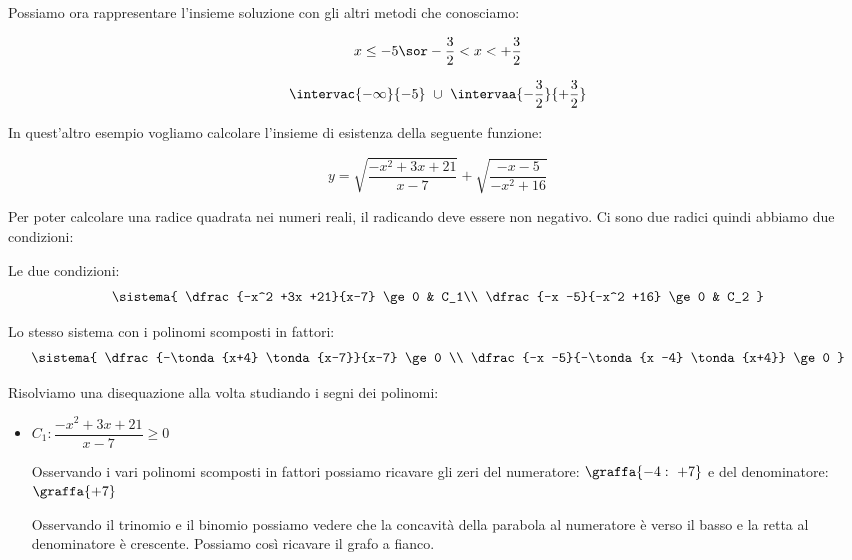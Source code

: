 \begin{esempio}
Possiamo ora rappresentare l'insieme soluzione con gli altri metodi che
conosciamo:

\begin{minipage}{.49 \linewidth}
\[x \le -5 \sor -\dfrac{3}{2} < x < +\dfrac{3}{2}\]
\end{minipage}
\hfill
\begin{minipage}{.49 \linewidth}
\[\intervac{-\infty}{-5}~\cup~\intervaa{-\dfrac{3}{2}}{+\dfrac{3}{2}}\]
\end{minipage}
\end{esempio}

\newpage %

\begin{esempio}

In quest'altro esempio vogliamo calcolare l'insieme di esistenza della
seguente funzione:

\[y = \sqrt{\dfrac{-x^2 +3x +21}{x-7}} + \sqrt{\dfrac{-x -5}{-x^2 +16}}
\]

Per poter calcolare una radice quadrata nei numeri reali, il radicando deve
essere non negativo. Ci sono due radici quindi abbiamo due condizioni:

\begin{minipage}{.49 \linewidth}
Le due condizioni:
 \[\sistema{
    \dfrac{-x^2 +3x +21}{x-7} \ge 0 & C_1\\
    \dfrac{-x -5}{-x^2 +16} \ge 0 & C_2
  }
\]
\end{minipage}
\begin{minipage}{.49 \linewidth}
Lo stesso sistema con i polinomi scomposti in fattori:
\[\sistema{
    \dfrac{-\tonda{x+4} \tonda{x-7}}{x-7} \ge 0 \\
    \dfrac{-x -5}{-\tonda{x -4} \tonda{x+4}} \ge 0
  }
\]
\end{minipage}

Risolviamo una disequazione alla volta studiando i segni dei polinomi:

\begin{itemize}
 \item \(C_1: \dfrac{-x^2 +3x +21}{x-7} \ge 0\)

Osservando i vari polinomi scomposti in fattori possiamo ricavare gli zeri
del numeratore: \(\graffa{-4:~+7}\) e del denominatore: \(\graffa{+7}\)

\begin{minipage}{.49\textwidth}
Osservando il trinomio e il binomio possiamo vedere che la concavità della
parabola al numeratore è verso il basso e la retta al
denominatore è crescente. Possiamo così ricavare il grafo a fianco.
\end{minipage}
\hfill
\begin{minipage}{.49\textwidth}
\begin{center} \segnosistemaba \end{center}
\end{minipage}


\end{itemize}
\end{esempio}
